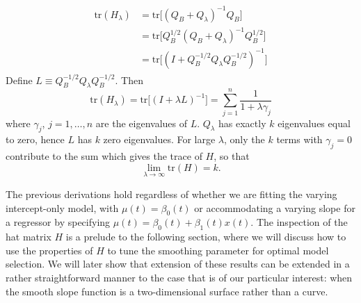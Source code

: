 \documentclass[12pt]{article}
\begin{document}
\begin{enumerate}
\begin{description}
\begin{align}
\begin{split}
\mbox{tr}\left(H_\lambda \right) &= \mbox{tr}\bigg[ \left(Q_B + Q_\lambda \right)^{-1}Q_B \bigg]\\
&=\mbox{tr}\bigg[ Q_B^{1/2}\left(Q_B + Q_\lambda \right)^{-1}Q_B^{1/2} \bigg] \\
&=\mbox{tr}\bigg[\left(I + Q_B^{-{1/2}}Q_\lambda Q_B^{-{1/2}} \right)^{-1} \bigg]
\end{split}
\end{align}
Define $L \equiv Q_B^{-{1/2}}Q_\lambda Q_B^{-{1/2}}$. Then
\begin{equation}
\mbox{tr}\left(H_\lambda \right) = \mbox{tr}\bigg[\left(I + \lambda L \right)^{-1} \bigg] = \sum_{j=1}^n \frac{1}{1 + \lambda \gamma_j}
\end{equation}
 where $\gamma_j$, $j=1,\dots,n$ are the eigenvalues of $L$. $Q_\lambda$ has exactly $k$ eigenvalues equal to zero, hence $L$ has $k$ zero eigenvalues. For large $\lambda$, only the $k$ terms with $\gamma_j=0$ contribute to the sum which gives the trace of $H$, so that
 \[
\lim_{\lambda \rightarrow \infty  } \mbox{tr}\left(H\right) = k.
 \]
\end{description}
\end{enumerate}

The previous derivations hold regardless of whether we are fitting the varying intercept-only model, with $\mu\left( t\right) = \beta_0\left(t\right)$ or accommodating a varying slope for a regressor by specifying $\mu\left( t\right) = \beta_0\left(t\right) + \beta_1\left(t\right)x\left(t\right)$. The inspection of the hat matrix $H$ is a prelude to the following section, where we will discuss how to use the properties of $H$ to tune the smoothing parameter for optimal model selection. We will later show that extension of these results can be extended in a rather straightforward manner to the case that is of our particular interest: when the smooth slope function is a two-dimensional surface rather than a curve.
\end{document}

